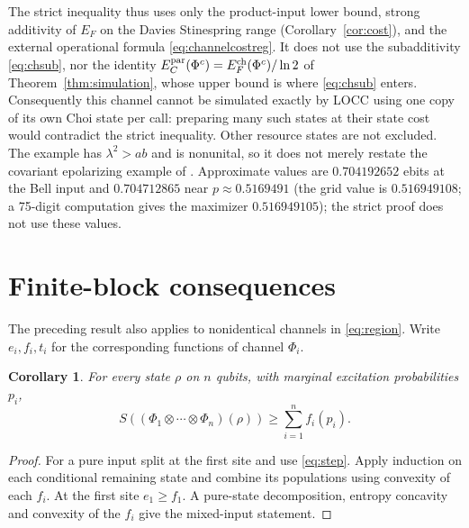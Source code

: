 \documentclass[11pt]{article}
\newtheorem{corollary}[theorem]{Corollary}
\begin{document}
The strict inequality thus uses only the product-input lower bound, strong additivity of $E_F$ on the Davies Stinespring range (Corollary~\ref{cor:cost}), and the external operational formula \eqref{eq:channelcostreg}. It does not use the subadditivity \eqref{eq:chsub}, nor the identity $E_C^{\rm par}(\Phi^c)=E_F^{\rm ch}(\Phi^c)/\ln2$ of Theorem~\ref{thm:simulation}, whose upper bound is where \eqref{eq:chsub} enters.
Consequently this channel cannot be simulated exactly by LOCC using one
copy of its own Choi state per call: preparing many such states at their
state cost would contradict the strict inequality. Other resource states
are not excluded. The example has $\lambda^2>ab$ and is nonunital, so it
does not merely restate the covariant epolarizing example of \cite{wilde}.
Approximate values are $0.704192652$ ebits at the Bell input and
$0.704712865$ near $p\approx0.5169491$ (the grid value is $0.516949108$; a 75-digit computation gives the maximizer $0.516949105$); the strict proof does not use these values.



\section{Finite-block consequences}
The preceding result also applies to nonidentical channels in \eqref{eq:region}. Write $e_i,f_i,t_i$ for the corresponding functions of channel $\Phi_i$.

\begin{corollary}\label{cor:multi}
For every state $\rho$ on $n$ qubits, with marginal excitation probabilities $p_i$,
\[
 S((\Phi_1\otimes\cdots\otimes\Phi_n)(\rho))
 \ge \sum_{i=1}^n f_i(p_i).
\]
\end{corollary}
\begin{proof}
For a pure input split at the first site and use \eqref{eq:step}. Apply induction on each conditional remaining state and combine its populations using convexity of each $f_i$. At the first site $e_1\ge f_1$. A pure-state decomposition, entropy concavity and convexity of the $f_i$ give the mixed-input statement.
\end{proof}
\end{document}
